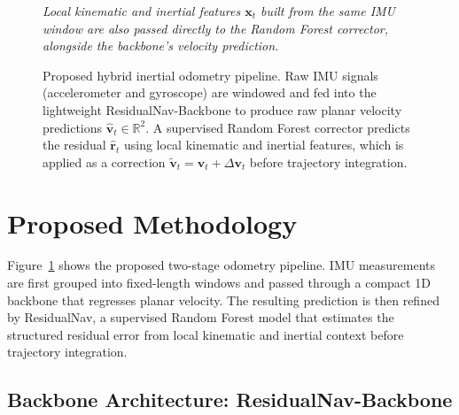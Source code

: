 \documentclass[10pt,conference,letterpaper]{IEEEtran}
\begin{document}
\begin{figure}[t]
\vspace{5pt}

{\scriptsize\itshape Local kinematic and inertial features $\mathbf{x}_t$ built
from the same IMU window are also passed directly to the Random Forest
corrector, alongside the backbone's velocity prediction.}

\caption{Proposed hybrid inertial odometry pipeline. Raw IMU signals
(accelerometer and gyroscope) are windowed and fed into the lightweight
ResidualNav-Backbone to produce raw planar velocity predictions
$\hat{\mathbf{v}}_t \in \mathbb{R}^2$. A supervised Random Forest
corrector predicts the residual $\hat{\mathbf{r}}_t$ using local
kinematic and inertial features, which is applied as a correction
$\tilde{\mathbf{v}}_t = \hat{\mathbf{v}}_t + \Delta\mathbf{v}_t$
before trajectory integration.}
\label{fig:pipeline}
\end{figure}

\section{Proposed Methodology}
\label{sec:method}

Figure~\ref{fig:pipeline} shows the proposed two-stage odometry pipeline. IMU measurements are first grouped into fixed-length windows and passed through a compact 1D backbone that regresses planar velocity. The resulting prediction is then refined by ResidualNav, a supervised Random Forest model that estimates the structured residual error from local kinematic and inertial context before trajectory integration.


\subsection{Backbone Architecture: ResidualNav-Backbone}
\end{document}
